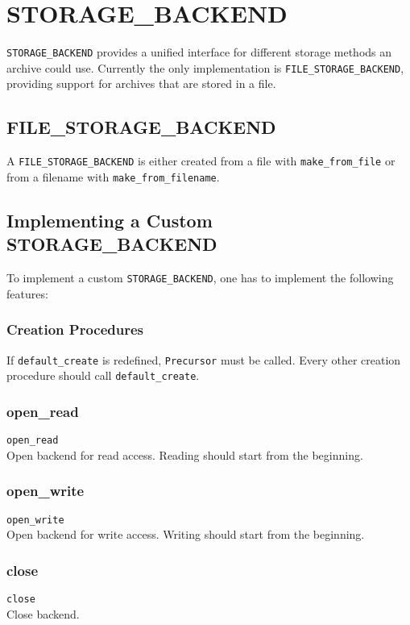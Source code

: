 \chapter{STORAGE\_BACKEND}
\lstinline;STORAGE_BACKEND; provides a unified interface for different storage
methods an archive could use. Currently the only implementation is
\lstinline;FILE_STORAGE_BACKEND;, providing support for archives that are stored
in a file.

\section{FILE\_STORAGE\_BACKEND}
A \lstinline;FILE_STORAGE_BACKEND; is either created from a file with
\lstinline;make_from_file; or from a filename with
\lstinline;make_from_filename;.

\section{Implementing a Custom STORAGE\_BACKEND}
To implement a custom \lstinline;STORAGE_BACKEND;, one has to implement the
following features:

\subsection{Creation Procedures}
If \lstinline;default_create; is redefined, \lstinline;Precursor; must be
called. Every other creation procedure should call \lstinline;default_create;.

\subsection{open\_read}
\lstinline;open_read;\\
Open backend for read access. Reading should start from the beginning.

\subsection{open\_write}
\lstinline;open_write;\\
Open backend for write access. Writing should start from the beginning.

\subsection{close}
\lstinline;close;\\
Close backend.

